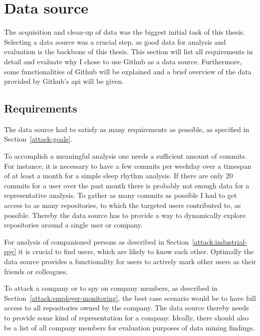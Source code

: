\section{Data source}\label{data-source}
The acquisition and clean-up of data was the biggest initial task of this thesis.
Selecting a data source was a crucial step, as good data for analysis and evaluation is the backbone of this thesis.
This section will list all requirements in detail and evaluate why I chose to use Github as a data source.
Furthermore, some functionalities of Github will be explained and a brief overview of the data provided by Github's \ac{api} will be given.


\subsection{Requirements}\label{requirements}
The data source had to satisfy as many requirements as possible, as specified in Section~\ref{attack-goals}.

To accomplish a meaningful analysis one needs a sufficient amount of commits.
For instance, it is necessary to have a few commits per weekday over a timespan of at least a month for a simple sleep rhythm analysis.
If there are only 20 commits for a user over the past month there is probably not enough data for a representative analysis.
To gather as many commits as possible I had to get access to as many repositories, to which the targeted users contributed to, as possible.
Thereby the data source has to provide a way to dynamically explore repositories around a single user or company.

For analysis of companioned persons as described in Section~\ref{attack:industrial-spy} it is crucial to find users, which are likely to know each other.
Optimally the data source provides a functionality for users to actively mark other users as their friends or colleagues.

To attack a company or to spy on company members, as described in Section~\ref{attack:employer-monitoring}, the best case scenario would be to have full access to all repositories owned by the company.
The data source thereby needs to provide some kind of representation for a company.
Ideally, there should also be a list of all company members for evaluation purposes of data mining findings.


